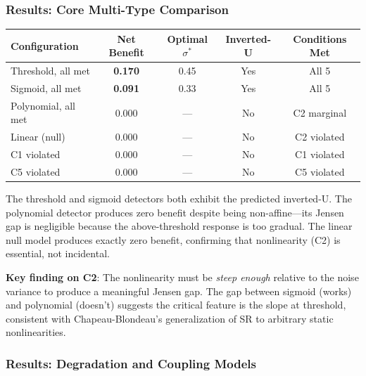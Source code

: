 \documentclass[12pt,letterpaper]{article}
\theoremstyle{definition}
\theoremstyle{remark}
\begin{document}
\subsubsection{Results: Core Multi-Type Comparison}

\begin{center}
\begin{tabular}{@{}lcccc@{}}
\toprule
\textbf{Configuration} & \textbf{Net Benefit} & \textbf{Optimal $\sigma^*$} & \textbf{Inverted-U} & \textbf{Conditions Met} \\
\midrule
Threshold, all met & \textbf{0.170} & 0.45 & Yes & All 5 \\
Sigmoid, all met & \textbf{0.091} & 0.33 & Yes & All 5 \\
Polynomial, all met & 0.000 & --- & No & C2 marginal \\
Linear (null) & 0.000 & --- & No & C2 violated \\
C1 violated & 0.000 & --- & No & C1 violated \\
C5 violated & 0.000 & --- & No & C5 violated \\
\bottomrule
\end{tabular}
\end{center}

The threshold and sigmoid detectors both exhibit the predicted inverted-U\@. The polynomial detector produces zero benefit despite being non-affine---its Jensen gap is negligible because the above-threshold response is too gradual. The linear null model produces exactly zero benefit, confirming that nonlinearity (C2) is essential, not incidental.

\textbf{Key finding on C2}: The nonlinearity must be \emph{steep enough} relative to the noise variance to produce a meaningful Jensen gap. The gap between sigmoid (works) and polynomial (doesn't) suggests the critical feature is the slope at threshold, consistent with Chapeau-Blondeau's \citeyearpar{chapeau1997} generalization of SR to arbitrary static nonlinearities.

\subsubsection{Results: Degradation and Coupling Models}
\end{document}
